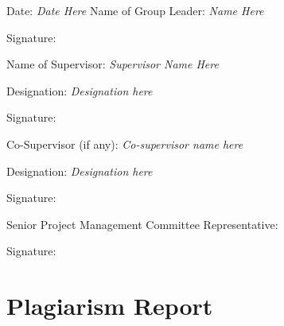 \begin{appendices}
\vspace{1cm}
Date: \textit{Date Here} Name of Group Leader: \textit{Name Here} 

Signature: 
\vspace{1cm}

Name of Supervisor: \textit{Supervisor Name Here}

Designation: \textit{Designation here}

Signature:
\vspace{1cm}

Co-Supervisor (if any): \textit{Co-supervisor name here}

Designation:		\textit{Designation here}
		   
Signature:		
\vspace{1cm}

Senior Project Management Committee Representative: 			

Signature:		                                                                        


\chapter{Plagiarism Report}
\end{appendices}